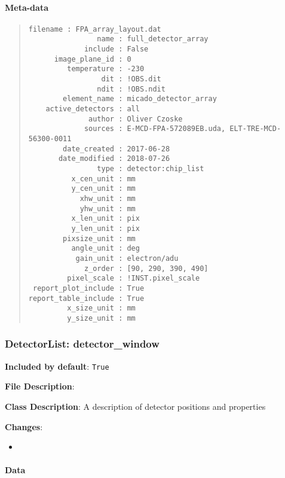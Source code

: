 \paragraph{Meta-data%
  \label{meta-data}%
}

\begin{quote}
\begin{alltt}
\begin{lstlisting}[frame=single]
            filename : FPA_array_layout.dat
                name : full_detector_array
             include : False
      image_plane_id : 0
         temperature : -230
                 dit : !OBS.dit
                ndit : !OBS.ndit
        element_name : micado_detector_array
    active_detectors : all
              author : Oliver Czoske
             sources : E-MCD-FPA-572089EB.uda, ELT-TRE-MCD-56300-0011
        date_created : 2017-06-28
       date_modified : 2018-07-26
                type : detector:chip_list
          x_cen_unit : mm
          y_cen_unit : mm
            xhw_unit : mm
            yhw_unit : mm
          x_len_unit : pix
          y_len_unit : pix
        pixsize_unit : mm
          angle_unit : deg
           gain_unit : electron/adu
             z_order : [90, 290, 390, 490]
         pixel_scale : !INST.pixel_scale
 report_plot_include : True
report_table_include : True
         x_size_unit : mm
         y_size_unit : mm
\end{lstlisting}
\end{alltt}
\end{quote}


\subsubsection{DetectorList: \textquotedbl{}detector\_window\textquotedbl{}%
  \label{detectorlist-detector-window}%
}

\textbf{Included by default}: \texttt{True}

\textbf{File Description}:

\textbf{Class Description}: A description of detector positions and properties

\textbf{Changes}:

\begin{itemize}
\item \end{itemize}


\paragraph{Data%
  \label{id1}%
}

